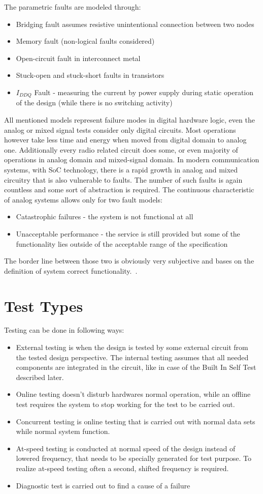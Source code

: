 The parametric faults are modeled through:
\begin{itemize}
    \item Bridging fault assumes resistive unintentional connection between two nodes
    \item Memory fault (non-logical faults considered)
    \item Open-circuit fault in interconnect metal
    \item Stuck-open and stuck-short faults in transistors
    \item $I_{DDQ}$ Fault - measuring the current by power supply during static operation of the design (while there is no switching activity)
\end{itemize}
All mentioned models represent failure modes in digital hardware logic, even the analog or mixed signal tests consider only digital circuits. Most operations however take less time and energy when moved from digital domain to analog one. Additionally every radio related circuit does some, or even majority of operations in analog domain and mixed-signal domain. In modern communication systems, with SoC technology, there is a rapid growth in analog and mixed circuitry that is also vulnerable to faults. The number of such faults is again countless and some sort of abstraction is required. The continuous characteristic of analog systems allows only for two fault models:
\begin{itemize}
    \item Catastrophic failures - the system is not functional at all
    \item Unacceptable performance - the service is still provided but some of the functionality lies outside of the acceptable range of the specification
\end{itemize}
The border line between those two is obviously very subjective and bases on the definition of system correct functionality.~\cite{book:Kabisatpathy}.
\section{Test Types}
Testing can be done in following ways:
\begin{itemize}
    \item External testing is when the design is tested by some external circuit from the tested design perspective. The internal testing assumes that all needed components are integrated in the circuit, like in case of the Built In Self Test described later.
    \item Online testing doesn't disturb hardwares normal operation, while an offline test requires the system to stop working for the test to be carried out.
    \item Concurrent testing is online testing that is carried out with normal data sets while normal system function.
    \item At-speed testing is conducted at normal speed of the design instead of lowered frequency, that needs to be specially generated for test purpose. To realize at-speed testing often a second, shifted frequency is required.
    \item Diagnostic test is carried out to find a cause of a failure
\end{itemize}

